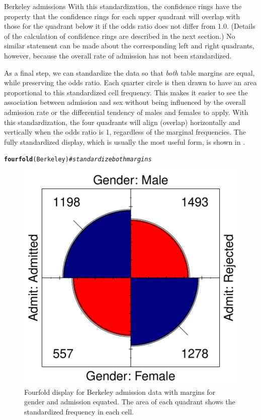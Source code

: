 \documentclass[11pt]{book}\usepackage[]{graphicx}\usepackage[]{color}
\makeatletter
\newcommand{\hlcom}[1]{\textcolor[rgb]{0.678,0.584,0.686}{\textit{#1}}}%
\newcommand{\hlstd}[1]{\textcolor[rgb]{0.345,0.345,0.345}{#1}}%
\newcommand{\hlkwd}[1]{\textcolor[rgb]{0.737,0.353,0.396}{\textbf{#1}}}%
\newenvironment{kframe}{%
 \def\at@end@of@kframe{}%
 \ifinner\ifhmode%
  \def\at@end@of@kframe{\end{minipage}}%
  \begin{minipage}{\columnwidth}%
 \fi\fi%
 \def\FrameCommand##1{\hskip\@totalleftmargin \hskip-\fboxsep
 \colorbox{shadecolor}{##1}\hskip-\fboxsep
     \hskip-\linewidth \hskip-\@totalleftmargin \hskip\columnwidth}%
 \MakeFramed {\advance\hsize-\width
   \@totalleftmargin\z@ \linewidth\hsize
   \@setminipage}}%
 {\par\unskip\endMakeFramed%
 \at@end@of@kframe}
\newenvironment{knitrout}{}{} %
\renewenvironment{knitrout}{\small\renewcommand{\baselinestretch}{.85}}{} %
\makeatother
\begin{document}
\begin{Example}[berkeley2]{Berkeley admissions}
With this standardization, the confidence rings have the property
that the confidence rings for each upper quadrant will overlap
with those for the quadrant below it if the
odds ratio does not differ from 1.0. 
(Details of the calculation of confidence rings are described
in the next section.)
No similar statement can be made about the
corresponding left and right quadrants, however, because
the overall rate of admission has not been standardized.

As a final step, we can standardize the data so that \emph{both} table margins
are equal, while preserving the odds ratio.
Each quarter circle is then drawn to have an area
proportional to this standardized cell frequency.  This makes it
easier to see the association between admission and sex without being
influenced by the overall admission rate or the differential tendency
of males and females to apply.  With this standardization, the four
quadrants will align (overlap) horizontally and vertically
when the odds ratio is 1, regardless of the
marginal frequencies.  The fully standardized display, which is
usually the most useful form, is shown in .

\begin{knitrout}
\color{fgcolor}\begin{kframe}
\begin{alltt}
\hlkwd{fourfold}\hlstd{(Berkeley)}  \hlcom{# standardize both margins}
\end{alltt}
\end{kframe}\begin{figure}[htbp]


\centerline{\includegraphics[width=.6\textwidth]{ch04/fig/berk-fourfold3} }

\caption[Fourfold display for Berkeley admission data with margins for gender and admission equated]{Fourfold display for Berkeley admission data with margins for gender and admission equated. The area of each quadrant shows the standardized frequency in each cell.\label{fig:berk-fourfold3}}
\end{figure}


\end{knitrout}


\end{Example}
\end{document}
